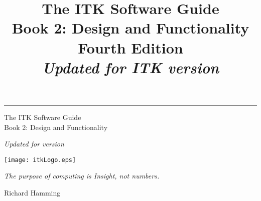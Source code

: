 \documentclass{InsightSoftwareGuide}
\title{The ITK Software Guide\\Book 2: Design and Functionality\\Fourth Edition\\ \emph{Updated for ITK version
\ITKVERSIONMAJORMINOR}}
\begin{document}
\ifitkPrintedVersion

  \begin{minipage}[t][3cm][b]{\textwidth}
  \rule{14cm}{1pt}
  \end{minipage}

  \begin{minipage}[t][3cm][b]{\textwidth}
  \Huge
  The ITK Software Guide\\
  Book 2: Design and Functionality\\
  \normalsize
  \par
  \emph{Updated for version \ITKVERSIONMAJORMINOR}\\

  \end{minipage}

  
  

\fi

\maketitle
\ifitkPrintedVersion
\fi

\frontmatter



%
%
%
\cleardoublepage

\begin{minipage}[t][10cm][b]{\textwidth}
\center
\texttt{[image: itkLogo.eps]}
\large
\begin{center}
\emph{The purpose of computing is Insight, not numbers.}\\
\end{center}
\hspace{8cm} Richard Hamming
\normalsize
\end{minipage}



%
\pagestyle{plain}
%


\ifitkPrintedVersion
  
\fi

\ifitkFullVersion
  
  
  
\fi
\end{document}

